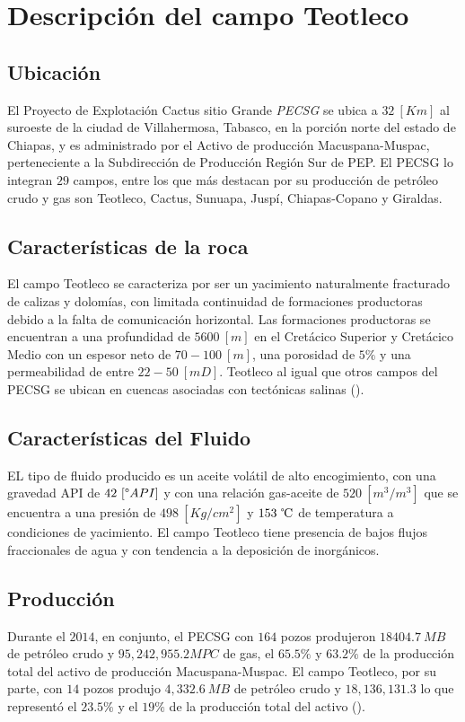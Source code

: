 \chapter{Descripción del campo Teotleco}
\label{chp:campo}


\section{Ubicación}
El Proyecto de Explotación Cactus sitio Grande \emph{PECSG} se ubica a $32~[Km]$ al suroeste de la ciudad de Villahermosa, Tabasco, en la porción norte del estado de Chiapas, y es administrado por el Activo de producción Macuspana-Muspac, perteneciente a la Subdirección de Producción Región Sur de PEP. El PECSG lo integran $29$ campos, entre los que más destacan por su producción de petróleo crudo y gas son Teotleco, Cactus, Sunuapa, Juspí, Chiapas-Copano y Giraldas. 



\section{Características de la roca}

El campo Teotleco se caracteriza por ser un yacimiento naturalmente fracturado de calizas y dolomías, con limitada continuidad de formaciones productoras debido a la falta de comunicación horizontal. Las formaciones productoras se encuentran a una profundidad de $5600~[m]$ en el Cretácico Superior y Cretácico Medio con un espesor neto de $70-100~[m]$, una porosidad de $5\%$ y una permeabilidad de entre $22-50~[mD]$. Teotleco al igual que otros campos del PECSG se ubican en cuencas asociadas con tectónicas salinas (\cite{PEMEX2012}).

\section{Características del Fluido}
EL tipo de fluido producido es un aceite volátil de alto encogimiento, con una gravedad API de $42~[\degree API]$ y con una relación gas-aceite de $520~[m^{3}/m^{3}] $ que se encuentra a una presión de $498~[Kg/cm^2]$ y $153~\celsius$ de temperatura a condiciones de yacimiento. El campo Teotleco tiene presencia de bajos flujos fraccionales de agua y con tendencia a la deposición de inorgánicos.


\section{Producción}
Durante el $2014$, en conjunto, el PECSG con $164$ pozos produjeron $18404.7~MB$ de petróleo crudo y $95,242,955.2 MPC$ de gas, el $65.5\%$ y $63.2\%$ de la producción total del activo de producción Macuspana-Muspac.
El campo Teotleco, por su parte, con $14$ pozos produjo $4,332.6~MB$ de petróleo crudo y $18,136,131.3$ lo que representó el $23.5\%$ y el $19\%$ de la producción total del activo (\cite{ASF2014}).




